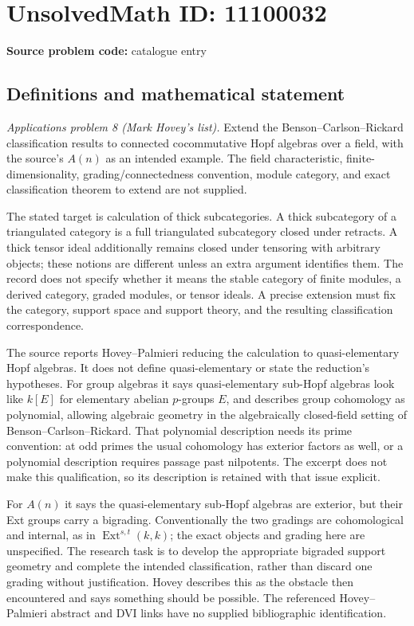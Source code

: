 \documentclass[11pt]{article}
\begin{document}
\section*{UnsolvedMath ID: 11100032}
\textbf{Source problem code:} catalogue entry
\subsection{Definitions and mathematical statement}
\emph{Applications problem 8 (Mark Hovey's list).} Extend the Benson--Carlson--Rickard classification results to connected cocommutative Hopf algebras over a field, with the source's \(A(n)\) as an intended example. The field characteristic, finite-dimensionality, grading/connectedness convention, module category, and exact classification theorem to extend are not supplied.

The stated target is calculation of thick subcategories. A thick subcategory of a triangulated category is a full triangulated subcategory closed under retracts. A thick tensor ideal additionally remains closed under tensoring with arbitrary objects; these notions are different unless an extra argument identifies them. The record does not specify whether it means the stable category of finite modules, a derived category, graded modules, or tensor ideals. A precise extension must fix the category, support space and support theory, and the resulting classification correspondence.

The source reports Hovey--Palmieri reducing the calculation to quasi-elementary Hopf algebras. It does not define quasi-elementary or state the reduction's hypotheses. For group algebras it says quasi-elementary sub-Hopf algebras look like \(k[E]\) for elementary abelian \(p\)-groups \(E\), and describes group cohomology as polynomial, allowing algebraic geometry in the algebraically closed-field setting of Benson--Carlson--Rickard. That polynomial description needs its prime convention: at odd primes the usual cohomology has exterior factors as well, or a polynomial description requires passage past nilpotents. The excerpt does not make this qualification, so its description is retained with that issue explicit.

For \(A(n)\) it says the quasi-elementary sub-Hopf algebras are exterior, but their Ext groups carry a bigrading. Conventionally the two gradings are cohomological and internal, as in \(\operatorname{Ext}^{s,t}(k,k)\); the exact objects and grading here are unspecified. The research task is to develop the appropriate bigraded support geometry and complete the intended classification, rather than discard one grading without justification. Hovey describes this as the obstacle then encountered and says something should be possible. The referenced Hovey--Palmieri abstract and DVI links have no supplied bibliographic identification.
\end{document}

